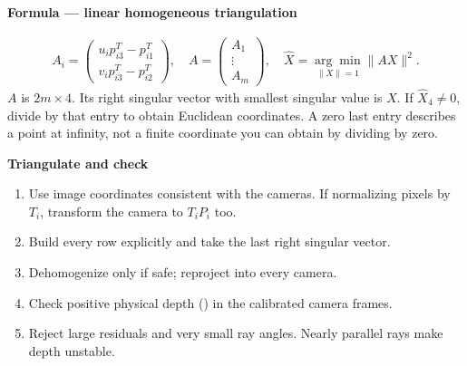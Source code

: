 \documentclass[letterpaper,11pt,english,openany,oneside]{jupyterBook}
\begin{document}
\begin{TextbookBox}
\textbf{Formula — linear homogeneous triangulation}\par\smallskip
\begin{equation}\label{equation:lectures/lecture06/triangulation:eq-lec06-triangulation}
\begin{split}A_i=\begin{pmatrix}u_ip_{i3}^T-p_{i1}^T\\v_ip_{i3}^T-p_{i2}^T\end{pmatrix},\quad
A=\begin{pmatrix}A_1\\\vdots\\A_m\end{pmatrix},\quad
\widehat X=\underset{\|X\|=1}{\arg\min}\|AX\|^2.\end{split}
\end{equation}
\sphinxAtStartPar
\(A\) is \(2m\times4\). Its right singular vector with smallest singular value is \(\widehat X\). If \(\widehat X_4\ne0\), divide by that entry to obtain Euclidean coordinates. A zero last entry describes a point at infinity, not a finite coordinate you can obtain by dividing by zero.

\end{TextbookBox}

\begin{TextbookBox}
\textbf{Triangulate and check}\par\smallskip
\begin{enumerate}
%
\item {}
\sphinxAtStartPar
Use image coordinates consistent with the cameras. If normalizing pixels by \(T_i\), transform the camera to \(T_iP_i\) too.

\item {}
\sphinxAtStartPar
Build every row explicitly and take the last right singular vector.

\item {}
\sphinxAtStartPar
Dehomogenize only if safe; reproject into every camera.

\item {}
\sphinxAtStartPar
Check positive physical depth () in the calibrated camera frames.

\item {}
\sphinxAtStartPar
Reject large residuals and very small ray angles. Nearly parallel rays make depth unstable.

\end{enumerate}

\end{TextbookBox}
\end{document}
